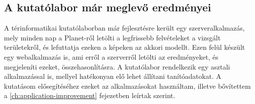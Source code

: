 \subsection{A kutatólabor már meglevő eredményei}

A térinformatikai kutatólaborban már fejlesztésre került egy szerveralkalmazás, mely minden nap a Planet-ről letölti a legfrissebb felvételeket a vizsgált területekről, és lefuttatja ezeken a képeken az akkori modellt. Ezen felül készült egy webalkalmazás is, ami erről a szerverről letölti az eredményeket, és megjeleníti ezeket, összehasonlításra. A kutatólabor rendelkezik egy asztali alkalmazással is, mellyel hatékonyan elő lehet állítani tanítóadatokat. A kutatásom elősegítéséhez ezeket az alkalmazásokat használtam, illetve bővítettem a \ref{ch:application-improvement} fejezetben leírtak szerint.